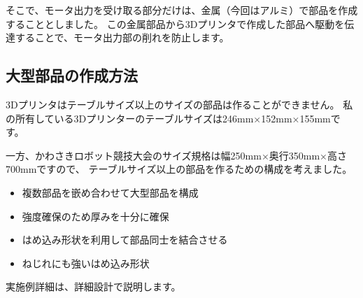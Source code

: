 そこで、モータ出力を受け取る部分だけは、金属（今回はアルミ）で部品を作成することとしました。
この金属部品から3Dプリンタで作成した部品へ駆動を伝達することで、モータ出力部の削れを防止します。

\subsection{大型部品の作成方法}\label{ux5927ux578bux90e8ux54c1ux306eux4f5cux6210ux65b9ux6cd5}

3Dプリンタはテーブルサイズ以上のサイズの部品は作ることができません。
私の所有している3Dプリンター\cite{replicator2x}のテーブルサイズは246mm×152mm×155mmです。

一方、かわさきロボット競技大会のサイズ規格は幅250mm×奥行350mm×高さ700mmですので、
テーブルサイズ以上の部品を作るための構成を考えました。

\begin{itemize}
\tightlist
\item
  複数部品を嵌め合わせて大型部品を構成
\item
  強度確保のため厚みを十分に確保
\item
  はめ込み形状を利用して部品同士を結合させる
\item
  ねじれにも強いはめ込み形状
\end{itemize}

実施例詳細は、詳細設計で説明します。
